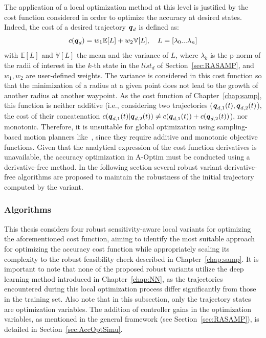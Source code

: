 The application of a local optimization method at this level is justified by the cost function considered in order to optimize the accuracy at desired states. 
Indeed, the cost of a desired trajectory $\boldsymbol{q}_d$ is defined as:
\begin{equation}\label{eq: cost}
    c(\boldsymbol{q}_d) = w_1\mathbb{E}[L] + w_2\mathbb{V}[L], \quad L = \left[\lambda_{0} ... \lambda_n \right]
\end{equation}
with $\mathbb{E}[L]$ and $\mathbb{V}[L]$ the mean and the variance of $L$, where $\lambda_k$ is the p-norm of the radii of interest in the $k$-th state in the $list_{d}$ of Section~\ref{sec:RASAMP}, and $w_1, w_2$ are user-defined weights.
The variance is considered in this cost function so that the minimization of a radius at a given point does not lead to the growth of another radius at another waypoint.
As the cost function of Chapter~\ref{chap:samp}, this function is neither additive (i.e., considering two trajectories ($\boldsymbol{q}_{d,1}(t), \boldsymbol{q}_{d,2}(t)$), the cost of their concatenation $c(\boldsymbol{q}_{d,1}(t)|\boldsymbol{q}_{d,2}(t)) \neq c(\boldsymbol{q}_{d,1}(t)) + c(\boldsymbol{q}_{d,2}(t))$), nor monotonic. 
Therefore, it is unsuitable for global optimization using sampling-based motion planners like~\cite{cRRT,cRRTstar}, since they require additive and monotonic objective functions.
Given that the analytical expression of the cost function derivatives is unavailable, the accuracy optimization in A-Optim must be conducted using a derivative-free method.
In the following section several robust variant derivative-free algorithms are proposed to maintain the robustness of the initial trajectory computed by the  variant.

\subsubsection{Algorithms}

This thesis considers four robust sensitivity-aware local variants for optimizing the aforementioned cost function, aiming to identify the most suitable approach for optimizing the accuracy cost function while appropriately scaling its complexity to the robust feasibility check described in Chapter~\ref{chap:samp}. 
It is important to note that none of the proposed robust variants utilize the deep learning method introduced in Chapter~\ref{chap:NN}, as the trajectories encountered during this local optimization process differ significantly from those in the training set.
Also note that in this subsection, only the trajectory states are optimization variables. 
The addition of controller gains in the optimization variables, as mentioned in the general framework (see Section~\ref{sec:RASAMP}), is detailed in Section~\ref{sec:AccOptSimu}.


